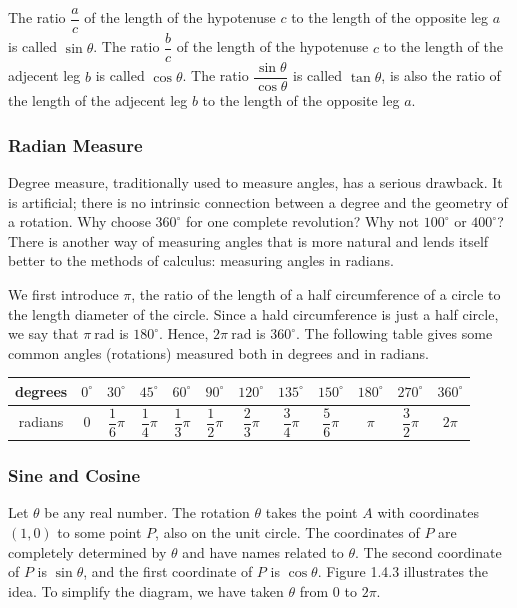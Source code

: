 \documentclass[11pt]{book}
\begin{document}
The ratio $\dfrac{a}{c}$ of the length of the hypotenuse $c$ to the length of the opposite leg $a$ is called $\sin\theta$. The ratio $\dfrac{b}{c}$ of the length of the hypotenuse $c$ to the length of the adjecent leg $b$ is called $\cos\theta$. The ratio $\dfrac{\sin\theta}{\cos\theta}$ is called $\tan\theta$, is also the ratio of the length of the adjecent leg $b$ to the length of the opposite leg $a$.

\subsubsection*{Radian Measure}

Degree measure, traditionally used to measure angles, has a serious
drawback. It is artificial; there is no intrinsic connection between a degree and the geometry of a rotation. Why choose $360^\circ$ for one complete revolution? Why not $100^\circ$ or $400^\circ$? There is another way of measuring angles that is more natural and lends itself better to the methods of calculus: measuring angles in radians.

We first introduce $\pi$, the ratio of the length of a half circumference of a circle to the length diameter of the circle. Since a hald circumference is just a half circle, we say that $\pi\ \text{rad}$ is $180^\circ$. Hence, $2\pi\ \text{rad}$ is $360^\circ$. The following table gives some common angles (rotations) measured both in degrees and in radians.

\begin{center}
    \begin{tabular}{|cccccccccccc|}
        \hline
        degrees & $0^\circ$ & $30^\circ$ & $45^\circ$ & $60^\circ$ & $90^\circ$ & $120^\circ$ & $135^\circ$ & $150^\circ$ & $180^\circ$ & $270^\circ$ & $360^\circ$\\
        \hline
        radians & $0$ & $\dfrac{1}{6}\pi$ & $\dfrac{1}{4}\pi$ & $\dfrac{1}{3}\pi$ & $\dfrac{1}{2}\pi$ & $\dfrac{2}{3}\pi$ & $\dfrac{3}{4}\pi$ & $\dfrac{5}{6}\pi$ & $\pi$ & $\dfrac{3}{2}\pi$ & $2\pi$\\[0.2em]
        \hline
    \end{tabular}
\end{center}

\subsubsection*{Sine and Cosine}

Let $\theta$ be any real number. The rotation $\theta$ takes the point $A$ with coordinates $(1, 0)$ to some point $P$, also on the unit circle. The coordinates of $P$ are completely determined by $\theta$ and have names related to $\theta$. The second coordinate of $P$ is $\sin\theta$, and the first coordinate of $P$ is $\cos\theta$. Figure 1.4.3 illustrates the idea. To simplify the diagram, we have taken $\theta$ from $0$ to $2\pi$.
\end{document}
